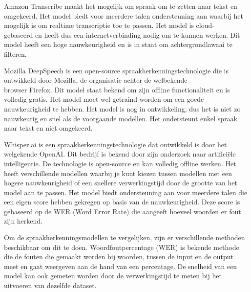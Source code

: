 Amazon Transcribe maakt het mogelijk om spraak om te zetten naar tekst en omgekeerd. Het model biedt voor meerdere talen ondersteuning aan waarbij het mogelijk is om realtime transcriptie toe te passen. Het model is cloud-\\gebaseerd en heeft dus een internetverbinding nodig om te kunnen werken. Dit model heeft een hoge nauwkeurigheid en is in staat om achtergrondlawaai te filteren. \autocite{Kumbhar2023}

Mozilla DeepSpeech is een open-source spraakherkenningstechnologie die is ontwikkeld door Mozilla, de organisatie achter de welbekende \\browser Firefox. Dit model staat bekend om zijn offline functionaliteit en is volledig gratis. Het model moet wel getraind worden om een goede nauwkeurigheid te hebben. Het model is nog in ontwikkeling, dus het is niet zo nauwkeurig en snel als de voorgaande modellen. Het ondersteunt enkel spraak naar tekst en niet omgekeerd. \autocite{Tang2022}

Whisper.ai is een spraakherkenningstechnologie dat ontwikkeld is door het welgekende OpenAI. Dit bedrijf is bekend door zijn onderzoek naar artificiële intelligentie. De technologie is open-source en kan volledig offline werken. Het heeft verschillende modellen waarbij je kunt kiezen tussen modellen met een hogere nauwkeurigheid of een snellere verwerkingstijd door de grootte van het model aan te passen. Het model biedt ondersteuning aan voor meerdere talen die een eigen score hebben gekregen op basis van de nauwkeurigheid. Deze score is gebaseerd op de WER (Word Error Rate) die aangeeft hoeveel woorden er fout zijn herkend. \autocite{OpenAI2023}

Om de spraakherkenningsmodellen te vergelijken, zijn er verschillende methoden beschikbaar om dit te doen. Woordfoutpercentage (WER) is bekende methode die de fouten die gemaakt worden bij woorden, tussen de input en de output meet en gaat weergeven aan de hand van een percentage. De snelheid van een model kan ook gemeten worden door de verwerkingstijd te meten bij het uitvoeren van dezelfde dataset.\\ \autocite{OConnor2023}



